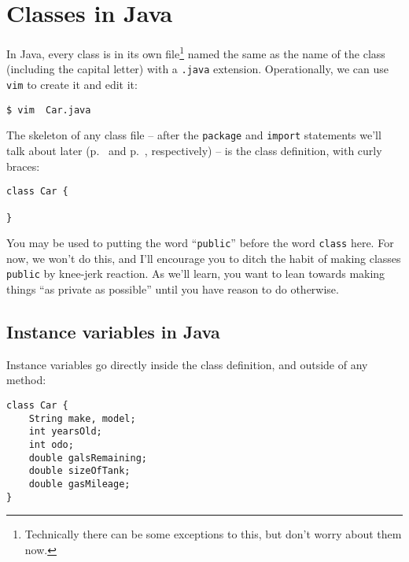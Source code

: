 \section{Classes in Java}

In Java, every class is in its own file\footnote{Technically there can be
some exceptions to this, but don't worry about them now.} named the same as
the name of the class (including the capital letter) with a \texttt{.java}
extension. Operationally, we can use \texttt{vim} to create it and edit it:

\begin{verbatim}
$ vim  Car.java
\end{verbatim}

The skeleton of any class file -- after the \texttt{package} and
\texttt{import} statements we'll talk about later (p.~\pageref{sec:packages} and 
p.~\pageref{sec:import}, respectively) -- is the class definition,
with curly braces:

\begin{Verbatim}[samepage=true,fontsize=\footnotesize,frame=single]
class Car {
    
}
\end{Verbatim}

You may be used to putting the word ``\texttt{public}'' before the word
\texttt{class} here. For now, we won't do this, and I'll encourage you to
ditch the habit of making classes \texttt{public} by knee-jerk reaction. As
we'll learn, you want to lean towards making things ``as private as possible''
until you have reason to do otherwise.

\subsection{Instance variables in Java}

Instance variables go directly inside the class definition, and outside of any
method:

\begin{Verbatim}[samepage=true,fontsize=\footnotesize,frame=single]
class Car {
    String make, model;
    int yearsOld;
    int odo;
    double galsRemaining;
    double sizeOfTank;
    double gasMileage;    
}
\end{Verbatim}

